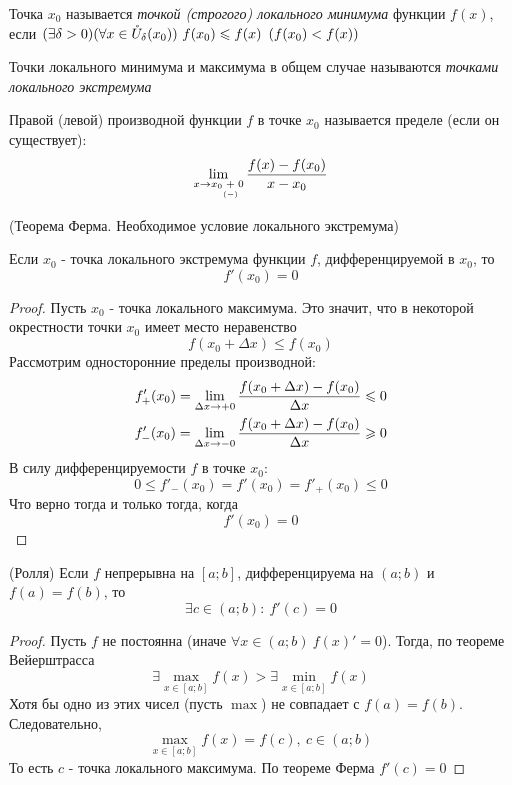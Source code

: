 \begin{definition}
	Точка $x_0$ называется \textit{точкой (строгого)
	локального минимума} функции $f(x)$, если $(\exists \delta > 0)
	(\forall x \in \mc{U}_{\delta}(x_0))\ f(x_0) \le f(x)\ 
	\left(f(x_0) < f(x)\right)$
\end{definition}

\begin{definition}
	Точки локального минимума и максимума в общем случае
	называются \textit{точками локального экстремума}
\end{definition}

\begin{definition}
	Правой (левой) производной функции $f$ в точке $x_0$ называется
	пределе (если он существует):
	\[
		\lim\limits_{x \to x_0 \underset{(-)}{+} 0} \frac{f(x) - f(x_0)}{x - x_0}
	\]
\end{definition}

\begin{theorem} (Теорема Ферма. Необходимое условие локального
	экстремума)

	Если $x_0$ - точка локального экстремума функции $f$, дифференцируемой в $x_0$, то
	\[
		f'(x_0) = 0
	\]
\end{theorem}

\begin{proof}
	Пусть $x_0$ - точка локального максимума. Это значит, что в некоторой окрестности точки $x_0$ имеет место неравенство
	\[
		f(x_0 + \Delta x) \le f(x_0)
	\]
	Рассмотрим односторонние пределы производной:
	\begin{align*}
		f'_+(x_0) = \lim\limits_{\Delta x \to +0}
		\frac{f(x_0 + \Delta x) - f(x_0)}{\Delta x} \leqslant 0
		\\
		f'_-(x_0) = \lim\limits_{\Delta x \to -0}
		\frac{f(x_0 + \Delta x) - f(x_0)}{\Delta x} \geqslant 0
	\end{align*}
	В силу дифференцируемости $f$ в точке $x_0$:
	\[
		0 \le f'_-(x_0) = f'(x_0) = f'_+(x_0) \le 0
	\]
	Что верно тогда и только тогда, когда
	\[
		f'(x_0) = 0
	\]
\end{proof}

\begin{theorem} (Ролля)
	Если $f$ непрерывна на $[a; b]$, дифференцируема на
	$(a; b)$ и $f(a) = f(b)$, то
	\[
		\exists c \in (a; b) :\ f'(c) = 0
	\]
\end{theorem}

\begin{proof}
	Пусть $f$ не постоянна
	(иначе $\forall x \in (a; b)\ f(x)' = 0$).
	Тогда, по теореме Вейерштрасса
	\[
		\exists \max\limits_{x \in [a; b]} f(x) > \exists
		\min\limits_{x \in [a; b]} f(x)
	\]
	Хотя бы одно из этих чисел (пусть $\max$) не совпадает с $f(a) = f(b)$. Следовательно,
	\[
		\max\limits_{x \in [a; b]} f(x) = f(c),\ c \in (a; b)
	\]
	То есть $c$ - точка локального максимума. По теореме Ферма $f'(c) = 0$
\end{proof}

